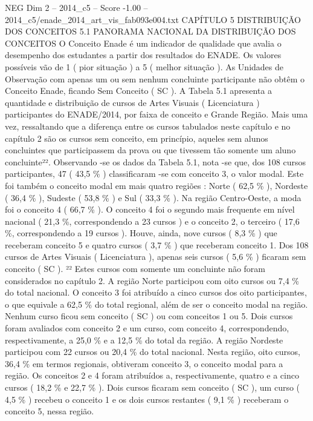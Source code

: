 \begin{textsample}{NEG Dim 2 – 2014\_c5 – Score -1.00 – 2014\_c5/enade\_2014\_art\_vis\_fab093e004.txt}  \label{ex:f2_neg_130}
CAPÍTULO 5 DISTRIBUIÇÃO DOS CONCEITOS 5.1 PANORAMA NACIONAL DA DISTRIBUIÇÃO DOS CONCEITOS O Conceito Enade é um indicador de qualidade que avalia o desempenho dos estudantes a partir dos resultados do ENADE.
Os valores possíveis vão de 1 ( pior situação ) a 5 ( melhor situação ).
As Unidades de Observação com apenas um ou sem nenhum concluinte participante não obtêm o Conceito Enade, ficando Sem Conceito ( SC ).
A Tabela 5.1 apresenta a quantidade e distribuição de cursos de Artes Visuais ( Licenciatura ) participantes do ENADE/2014, por faixa de conceito e Grande Região.
Mais uma vez, ressaltando que a diferença entre os cursos tabulados neste capítulo e no capítulo 2 são os cursos sem conceito, em princípio, aqueles sem alunos concluintes que participassem da prova ou que tivessem tão somente um aluno concluinte²².
Observando -se os dados da Tabela 5.1, nota -se que, dos 108 cursos participantes, 47 ( 43,5 \% ) classificaram -se com conceito 3, o valor modal.
Este foi também o conceito modal em mais quatro regiões : Norte ( 62,5 \% ), Nordeste ( 36,4 \% ), Sudeste ( 53,8 \% ) e Sul ( 33,3 \% ).
Na região Centro-Oeste, a moda foi o conceito 4 ( 66,7 \% ).
O conceito 4 foi o segundo mais frequente em nível nacional ( 21,3 \%, correspondendo a 23 cursos ) e o conceito 2, o terceiro ( 17,6 \%, correspondendo a 19 cursos ).
Houve, ainda, nove cursos ( 8,3 \% ) que receberam conceito 5 e quatro cursos ( 3,7 \% ) que receberam conceito 1.
Dos 108 cursos de Artes Visuais ( Licenciatura ), apenas seis cursos ( 5,6 \% ) ficaram sem conceito ( SC ). ²² Estes cursos com somente um concluinte não foram considerados no capítulo 2.
A região Norte participou com oito cursos ou 7,4 \% do total nacional.
O conceito 3 foi atribuído a cinco cursos dos oito participantes, o que equivale a 62,5 \% do total regional, além de ser o conceito modal na região.
Nenhum curso ficou sem conceito ( SC ) ou com conceitos 1 ou 5.
Dois cursos foram avaliados com conceito 2 e um curso, com conceito 4, correspondendo, respectivamente, a 25,0 \% e a 12,5 \% do total da região.
A região Nordeste participou com 22 cursos ou 20,4 \% do total nacional.
Nesta região, oito cursos, 36,4 \% em termos regionais, obtiveram conceito 3, o conceito modal para a região.
Os conceitos 2 e 4 foram atribuídos a, respectivamente, quatro e a cinco cursos ( 18,2 \% e 22,7 \% ).
Dois cursos ficaram sem conceito ( SC ), um curso ( 4,5 \% ) recebeu o conceito 1 e os dois cursos restantes ( 9,1 \% ) receberam o conceito 5, nessa região.

\end{textsample}
